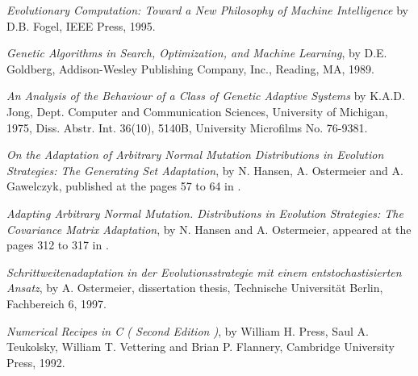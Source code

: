 \begin{thebibliography}{55}
    {\em Evolutionary Computation: Toward a New Philosophy of
    Machine Intelligence} by D.B. Fogel, IEEE Press, 1995.

    {\em Genetic Algorithms in Search, Optimization, and Machine Learning}, 
    by D.E. Goldberg, Addison-Wesley Publishing Company, Inc., Reading, MA, 
    1989.

    {\em An Analysis of the Behaviour of a Class of Genetic Adaptive
    Systems} by K.A.D. Jong, Dept. Computer and Communication Sciences,
    University of Michigan, 1975, Diss. Abstr. Int. 36(10), 5140B,
    University Microfilms No. 76-9381.

    {\em On the Adaptation of Arbitrary Normal Mutation Distributions
    in Evolution Strategies: The Generating Set Adaptation},
    by N. Hansen, A. Ostermeier and A. Gawelczyk, published at the pages
    57 to 64 in \cite{Eshelman95}. 

    {\em Adapting Arbitrary Normal Mutation. Distributions in Evolution
    Strategies: The Covariance Matrix Adaptation}, by N. Hansen and A. 
    Ostermeier, appeared at the pages 312 to 317 in \cite{ICEC96}.

    {\em Schrittweitenadaptation in der Evolutionsstrategie mit einem
    ent\-sto\-chasti\-sier\-ten Ansatz}, by A. Ostermeier, dissertation thesis, 
    Technische Universit\"at Berlin, Fachbereich 6, 1997.

    {\em Numerical Recipes in C ( Second Edition )}, by William
    H. Press, Saul A. Teukolsky, William T. Vettering and Brian
    P. Flannery, Cambridge University Press, 1992. \label{NRC}

\end{thebibliography}
